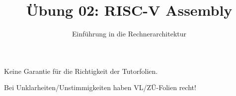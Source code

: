 

\title{Übung 02: RISC-V Assembly}
\subtitle{Einführung in die Rechnerarchitektur}
\date{}



\maketitle

\begin{frame}[c]{}{}
	\begin{center}
		\LARGE  Keine Garantie für die Richtigkeit der Tutorfolien.

		\Large Bei Unklarheiten/Unstimmigkeiten haben VL/ZÜ-Folien recht!
	\end{center}
\end{frame}

